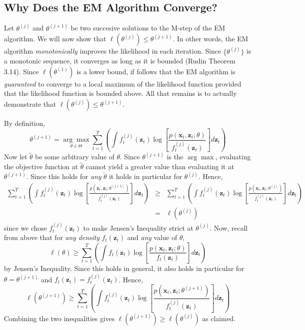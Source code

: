 \subsection{Why Does the EM Algorithm Converge?}
Let $\theta^{(j)}$ and $\theta^{(j+1)}$ be two succesive solutions to the M-step of the EM algorithm. We will now show that $\ell(\theta^{(j)}) \leq \theta^{(j+1)}$. In other words, the EM algorithm \emph{monotonically} improves the likelihood in each iteration. Since $\{\theta^{(j)}\}$ is a monotonic sequence, it converges as long as it is bounded (Rudin Theorem 3.14). Since $\ell(\theta^{(1)})$ is a lower bound, if follows that the EM algorithm is \emph{guaranteed} to converge to a local maximum of the likelihood function provided that the likelihood function is bounded above. All that remains is to actually demonstrate that $\ell(\theta^{(j)}) \leq \theta^{(j+1)}$.

By definition, 
	$$\theta^{(j+1)} = \underset{\theta \in \Theta}{\arg \max} \sum_{t = 1}^T  \left(\int f_t^{(j)}(\mathbf{z}_t) \log\left[\frac{p(\textbf{x}_t,\textbf{z}_t;\theta)}{f_t^{(j)}(\mathbf{z}_t)}\right]d \textbf{z}_t \right)$$ 
Now let $\tilde{\theta}$ be some arbitrary value of $\theta$. Since $\theta^{(j+1)}$ is the $\arg \max$, evaluating the objective function at $\tilde{\theta}$ cannot yield a greater value than evaluating it at $\theta^{(j+1)}$. Since this holds for \emph{any} $\tilde{\theta}$ it holds in particular for $\theta^{(j)}$. Hence, 
	\begin{eqnarray*}
		\sum_{t = 1}^T  \left(\int f_t^{(j)}(\mathbf{z}_t) \log\left[\frac{p(\textbf{x}_t,\textbf{z}_t;\theta^{(j+1)})}{f_t^{(j)}(\mathbf{z}_t)}\right] d \textbf{z}_t \right) 
		&\geq& 
		\sum_{t = 1}^T  \left(\int f_t^{(j)}(\mathbf{z}_t) \log\left[\frac{p(\textbf{x}_t,\textbf{z}_t;\theta^{(j)})}{f_t^{(j)}(\mathbf{z}_t)}\right] d \textbf{z}_t \right)\\
		&=& \ell(\theta^{(j)})
	\end{eqnarray*}
since we chose $f^{(j)}_t(\mathbf{z}_t)$ to make Jensen's Inequality strict at $\theta^{(j)}$. Now, recall from above that for \emph{any density} $f_t(\mathbf{z}_t)$ and \emph{any} value of $\theta$,
	$$\ell(\theta) \geq \sum_{t=1}^T \left(\int f_t(\mathbf{z}_t) \log\left[\frac{p(\textbf{x}_t,\textbf{z}_t;\theta)}{f_t(\mathbf{z}_t)}\right] d \textbf{z}_t \right)$$
by Jensen's Inequality. Since this holds in general, it also holds in particular for $\theta = \theta^{(j+1)}$ and $f_t(\mathbf{z}_t)= f_t^{(j)}(\mathbf{z}_t)$. Hence,
	$$\ell(\theta^{(j+1)}) \geq \sum_{t=1}^T \left(\int f_t^{(j)}(\mathbf{z}_t) \log\left[\frac{p(\textbf{x}_t,\textbf{z}_t;\theta^{(j+1)})}{f_t^{(j)}(\mathbf{z}_t)}\right] d \textbf{z}_t \right)$$
Combining the two inequalities gives $\ell(\theta^{(j+1)}) \geq \ell(\theta^{(j)})$ as claimed.


